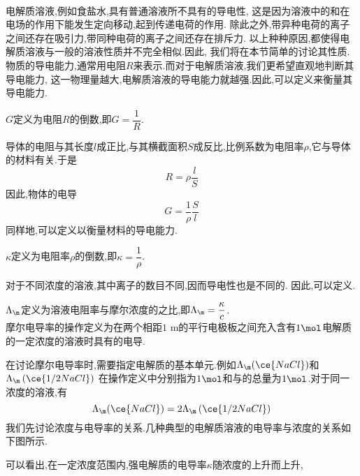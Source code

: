 \documentclass{ctexart}
\begin{document}
\pagestyle{plain}
\noindent{}\vspace{15pt}\\
\indent 电解质溶液,例如食盐水,具有普通溶液所不具有的导电性,%
这是因为溶液中的和在电场的作用下能发生定向移动,起到传递电荷的作用.%
除此之外,带异种电荷的离子之间还存在吸引力,带同种电荷的离子之间还存在排斥力.%
以上种种原因,都使得电解质溶液与一般的溶液性质并不完全相似.因此,%
我们将在本节简单的讨论其性质.\vspace{12pt}\\
\indent 物质的导电能力,通常用电阻$R$来表示.而对于电解质溶液,我们更希望直观地判断其导电能力,%
这一物理量越大,电解质溶液的导电能力就越强.因此,可以定义来衡量其导电能力.
\begin{definition}[6A.1.1 电导]
    $G$定义为电阻$R$的倒数,即$G=\dfrac1R$.
\end{definition}
导体的电阻与其长度$l$成正比,与其横截面积$S$成反比,比例系数为电阻率$\rho$,它与导体的材料有关.于是
\[R=\rho\dfrac{l}{S}\]
因此,物体的电导
\[G=\dfrac{1}{\rho}\dfrac{S}{l}\]
同样地,可以定义以衡量材料的导电能力.
\begin{definition}[6A.1.2 电导率]
    $\kappa$定义为电阻率$\rho$的倒数,即$\kappa=\dfrac{1}{\rho}$.
\end{definition}
对于不同浓度的溶液,其中离子的数目不同,因而导电性也是不同的.%
因此,可以定义.
\begin{definition}[6A.1.3 摩尔电导率]
    $\Lambda_\m$定义为溶液电阻率与摩尔浓度的之比,即$\Lambda_\m=\dfrac{\kappa}{c}$.\\
    摩尔电导率的操作定义\footnotemark 为在两个相距$1\text{ m}$的平行电极板之间充入含有$1\mol$电解质的一定浓度的溶液时具有的电导.
\end{definition}
在讨论摩尔电导率时,需要指定电解质的基本单元.例如$\Lambda_\m(\ce{NaCl})$和$\displaystyle\Lambda_\m\left(\ce{1/2NaCl}\right)$%
在操作定义中分别指为$1\mol$和与的总量为$1\mol$.对于同一浓度的溶液,有
\[\Lambda_\m(\ce{NaCl})=2\Lambda_\m\left(\ce{1/2NaCl}\right)\]
\indent 我们先讨论浓度与电导率的关系.几种典型的电解质溶液的电导率与浓度的关系如下图所示.
\begin{tightcenter}
    
\end{tightcenter}
可以看出,在一定浓度范围内,强电解质的电导率$\kappa$随浓度的上升而上升,%
\end{document}
